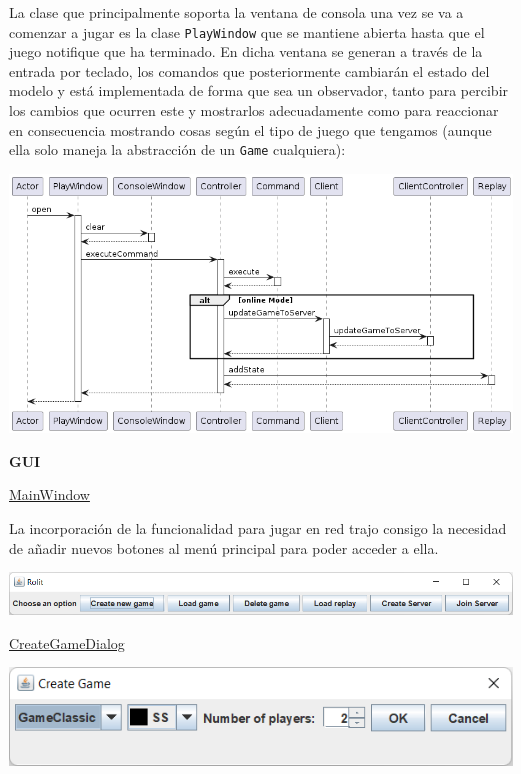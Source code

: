 \documentclass[../DocumentoOficial.tex]{subfiles}
\begin{document}
\begin{sprint}[5]
La clase que principalmente soporta la ventana de consola una vez se va a comenzar a jugar es la clase \texttt{PlayWindow} que se mantiene abierta hasta que el juego notifique que ha terminado. En dicha ventana se generan a través de la entrada por teclado, los comandos que posteriormente cambiarán el estado del modelo y está implementada de forma que sea un observador, tanto para percibir los cambios que ocurren este y mostrarlos adecuadamente como para reaccionar en consecuencia mostrando cosas según el tipo de juego que tengamos (aunque ella solo maneja la abstracción de un \texttt{Game} cualquiera):
\begin{center}
\includegraphics[scale=0.5]{PlayWindow_sprint5_seq}
\end{center}

\textbf{GUI}

\underline{MainWindow}

La incorporación de la funcionalidad para jugar en red trajo consigo  la necesidad de añadir nuevos botones al menú principal para poder acceder a ella.

\begin{center}
\includegraphics[scale=0.6]{menu-sprint5.png}
\end{center}

\underline{CreateGameDialog}

\begin{center}
\includegraphics[scale=0.8]{create-game-sprint5.png}
\end{center}


\end{sprint}
\end{document}

